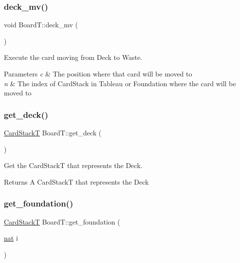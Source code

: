 \subsubsection{\texorpdfstring{deck\+\_\+mv()}{deck\_mv()}}
{\footnotesize\ttfamily void Board\+T\+::deck\+\_\+mv (\begin{DoxyParamCaption}{ }\end{DoxyParamCaption})}



Execute the card moving from Deck to Waste. 


\begin{DoxyParams}{Parameters}
{\em c} & The position where that card will be moved to \\
\hline
{\em n} & The index of Card\+Stack in Tableau or Foundation where the card will be moved to \\
\hline
\end{DoxyParams}
\mbox{\label{class_board_t_a2f28e0a5e9c34f396e2aebc79342a225}} 
\subsubsection{\texorpdfstring{get\+\_\+deck()}{get\_deck()}}
{\footnotesize\ttfamily \hyperlink{class_stack}{Card\+StackT} Board\+T\+::get\+\_\+deck (\begin{DoxyParamCaption}{ }\end{DoxyParamCaption})}



Get the Card\+StackT that represents the Deck. 

\begin{DoxyReturn}{Returns}
A Card\+StackT that represents the Deck 
\end{DoxyReturn}
\mbox{\label{class_board_t_a36b248009b981480065f741a0249809f}} 
\subsubsection{\texorpdfstring{get\+\_\+foundation()}{get\_foundation()}}
{\footnotesize\ttfamily \hyperlink{class_stack}{Card\+StackT} Board\+T\+::get\+\_\+foundation (\begin{DoxyParamCaption}\item[{\hyperlink{_card_types_8h_a56638ee9d162e8cce3a15f92d2023d6e}{nat}}]{i }\end{DoxyParamCaption})}



